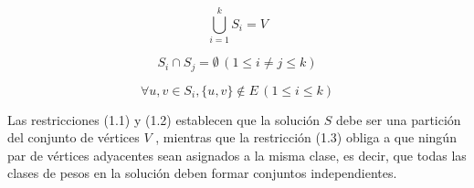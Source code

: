\begin{equation}
	\displaystyle \bigcup_{i = 1} ^ {k} S_{i} = V
\end{equation}

\begin{equation}
	\displaystyle S_{i} \cap S_{j} = \emptyset \, (1 \leq i \neq j \leq k)
\end{equation}

\begin{equation}
	\displaystyle \forall u, v \in S_{i}, \{u, v\} \notin E \, (1 \leq i \leq k)
\end{equation}

\newpage
Las restricciones (1.1) y (1.2) establecen que la solución $S$ debe ser una partición del conjunto de vértices $V$ , mientras que la restricción (1.3) obliga a que ningún par de vértices adyacentes sean asignados a la misma clase, es decir, que todas las clases de pesos en la solución deben formar conjuntos independientes.


